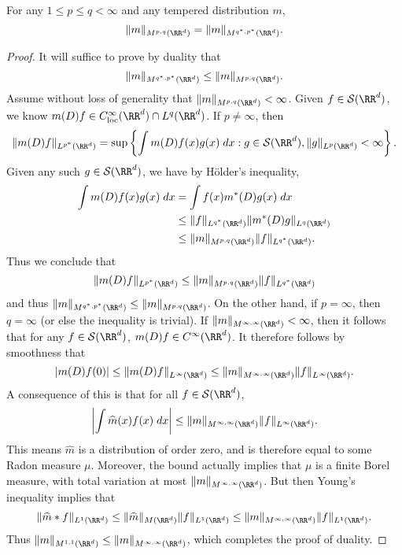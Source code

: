 \begin{theorem}
  For any $1 \leq p \leq q < \infty$ and any tempered distribution $m$,
  \[ \| m \|_{M^{p,q}(\RR^d)} = \| m \|_{M^{q^*,p^*}(\RR^d)}. \]
\end{theorem}
\begin{proof}
    It will suffice to prove by duality that
    \[ \| m \|_{M^{q^*,p^*}(\RR^d)} \leq \| m \|_{M^{p,q}(\RR^d)}. \]
    Assume without loss of generality that $\| m \|_{M^{p,q}(\RR^d)} < \infty$. Given $f \in \mathcal{S}(\RR^d)$, we know $m(D) f \in C^\infty_{\text{loc}}(\RR^d) \cap L^q(\RR^d)$. If $p \neq \infty$, then
    \[ \| m(D) f \|_{L^{p^*}(\RR^d)} = \sup \left\{ \int m(D)f(x) g(x)\; dx : g \in \mathcal{S}(\RR^d), \| g \|_{L^p(\RR^d)} < \infty \right\}. \]
    Given any such $g \in \mathcal{S}(\RR^d)$, we have by H\"{o}lder's inequality,
    \begin{align*}
        \int m(D)f(x) g(x)\; dx &= \int f(x) m^*(D) g(x)\; dx\\
        &\leq \| f \|_{L^{q^*}(\RR^d)} \| m^*(D) g \|_{L^q(\RR^d)}\\
        &\leq \| m \|_{M^{p,q}(\RR^d)} \| f \|_{L^{q^*}(\RR^d)}.
    \end{align*}
    Thus we conclude that
    \[ \| m(D) f \|_{L^{p^*}(\RR^d)} \leq \| m \|_{M^{p,q}(\RR^d)} \| f \|_{L^{q^*}(\RR^d)} \]
    and thus $\| m \|_{M^{q^*,p^*}(\RR^d)} \leq \| m \|_{M^{p,q}(\RR^d)}$. On the other hand, if $p = \infty$, then $q = \infty$ (or else the inequality is trivial). If $\| m \|_{M^{\infty,\infty}(\RR^d)} < \infty$, then it follows that for any $f \in \mathcal{S}(\RR^d)$, $m(D) f \in C^\infty(\RR^d)$. It therefore follows by smoothness that
    \[ |m(D) f(0)| \leq \| m(D) f \|_{L^\infty(\RR^d)} \leq \| m \|_{M^{\infty,\infty}(\RR^d)} \| f \|_{L^\infty(\RR^d)}. \]
    A consequence of this is that for all $f \in \mathcal{S}(\RR^d)$,
    \[ \left| \int \widehat{m}(x) f(x)\; dx \right| \leq \| m \|_{M^{\infty,\infty}(\RR^d)} \| f \|_{L^\infty(\RR^d)}. \]
    This means $\widehat{m}$ is a distribution of order zero, and is therefore equal to some Radon measure $\mu$. Moreover, the bound actually implies that $\mu$ is a finite Borel measure, with total variation at most $\| m \|_{M^{\infty,\infty}(\RR^d)}$. But then Young's inequality implies that
    \[ \| \widehat{m} * f \|_{L^1(\RR^d)} \leq \| \widehat{m} \|_{M(\RR^d)} \| f \|_{L^1(\RR^d)} \leq \| m \|_{M^{\infty,\infty}(\RR^d)} \| f \|_{L^1(\RR^d)}. \]
    Thus $\| m \|_{M^{1,1}(\RR^d)} \leq \| m \|_{M^{\infty,\infty}(\RR^d)}$, which completes the proof of duality.
\end{proof}

